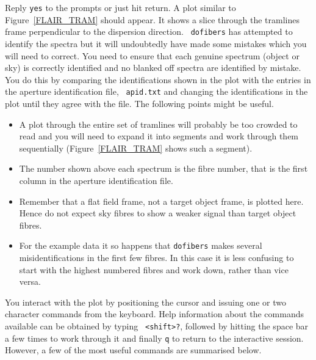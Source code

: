\documentclass[twoside,11pt]{article}
\begin{document}
\begin{enumerate}
   Reply {\tt yes} to the prompts or just hit return.  A plot similar
   to Figure~\ref{FLAIR_TRAM} should appear.  It shows a slice through
   the tramlines frame perpendicular to the dispersion direction.  {\tt
   dofibers} has attempted to identify the spectra but it will
   undoubtedly have made some mistakes which you will need to correct.
   You need to ensure that each genuine spectrum (object or sky) is
   correctly identified and no blanked off spectra are identified by
   mistake.  You do this by comparing the identifications shown in the
   plot with the entries in the aperture identification file, {\tt
   apid.txt} and changing the identifications in the plot until they
   agree with the file.  The following points might be useful.

  \begin{itemize}

    \item A plot through the entire set of tramlines will probably be
     too crowded to read and you will need to expand it into segments and
     work through them sequentially (Figure~\ref{FLAIR_TRAM} shows such a
     segment).

    \item The number shown above each spectrum is the fibre number, that
     is the first column in the aperture identification file.

    \item Remember that a flat field frame, not a target object frame,
     is plotted here.  Hence do not expect sky fibres to show a weaker
     signal than target object fibres.

    \item For the example data it so happens that {\tt dofibers} makes
     several misidentifications in the first few fibres.  In this case
     it is less confusing to start with the highest numbered fibres
     and work down, rather than vice versa.

  \end{itemize}

   You interact with the plot by positioning the cursor and issuing
   one or two character commands from the keyboard.  Help information
   about the commands available can be obtained by typing {\tt
   <shift>?}, followed by hitting the space bar a few times to work
   through it and finally {\tt q} to return to the interactive session.
   However, a few of the most useful commands are summarised below.

  \begin{description}


\end{description}
\end{enumerate}
\end{document}
